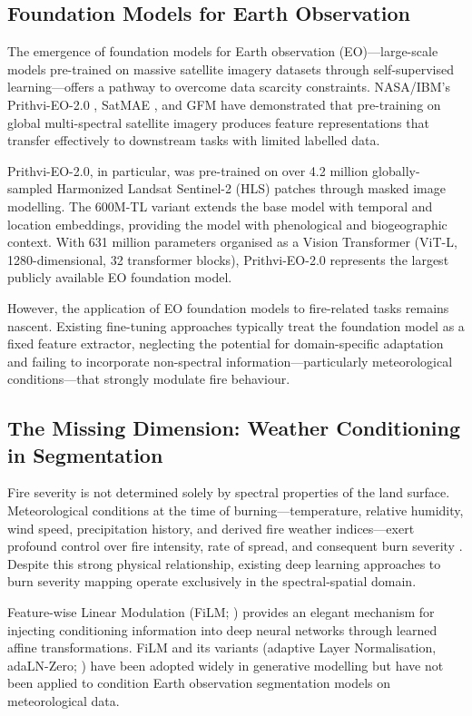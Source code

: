 \documentclass[review,12pt]{elsarticle}
\begin{document}
\subsection{Foundation Models for Earth Observation}

The emergence of foundation models for Earth observation (EO)---large-scale models pre-trained on massive satellite imagery datasets through self-supervised learning---offers a pathway to overcome data scarcity constraints. NASA/IBM's Prithvi-EO-2.0 \citep{jakubik2024}, SatMAE \citep{cong2022}, and GFM \citep{mendieta2023} have demonstrated that pre-training on global multi-spectral satellite imagery produces feature representations that transfer effectively to downstream tasks with limited labelled data.

Prithvi-EO-2.0, in particular, was pre-trained on over 4.2 million globally-sampled Harmonized Landsat Sentinel-2 (HLS) patches through masked image modelling. The 600M-TL variant extends the base model with temporal and location embeddings, providing the model with phenological and biogeographic context. With 631 million parameters organised as a Vision Transformer (ViT-L, 1280-dimensional, 32 transformer blocks), Prithvi-EO-2.0 represents the largest publicly available EO foundation model.

However, the application of EO foundation models to fire-related tasks remains nascent. Existing fine-tuning approaches typically treat the foundation model as a fixed feature extractor, neglecting the potential for domain-specific adaptation and failing to incorporate non-spectral information---particularly meteorological conditions---that strongly modulate fire behaviour.

\subsection{The Missing Dimension: Weather Conditioning in Segmentation}

Fire severity is not determined solely by spectral properties of the land surface. Meteorological conditions at the time of burning---temperature, relative humidity, wind speed, precipitation history, and derived fire weather indices---exert profound control over fire intensity, rate of spread, and consequent burn severity \citep{vanwagner1987,flannigan2005}. Despite this strong physical relationship, existing deep learning approaches to burn severity mapping operate exclusively in the spectral-spatial domain.

Feature-wise Linear Modulation (FiLM; \citealt{perez2018}) provides an elegant mechanism for injecting conditioning information into deep neural networks through learned affine transformations. FiLM and its variants (adaptive Layer Normalisation, adaLN-Zero; \citealt{peebles2023}) have been adopted widely in generative modelling but have not been applied to condition Earth observation segmentation models on meteorological data.
\end{document}
